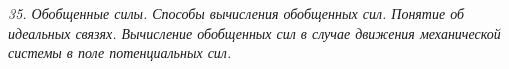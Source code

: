 \emph{35. Обобщенные силы. Способы вычисления обобщенных сил. Понятие об
идеальных связях. Вычисление обобщенных сил в случае движения механической
системы в поле потенциальных сил.}

\newpage

